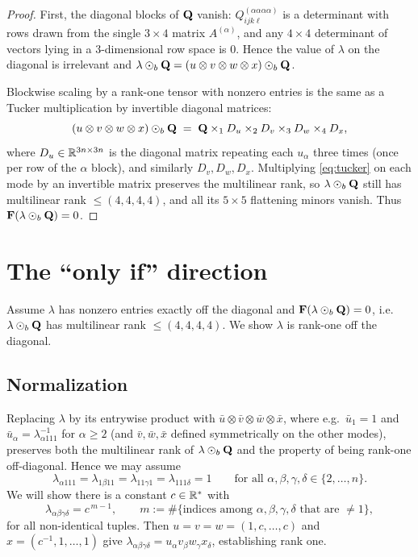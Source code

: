\documentclass[11pt]{article}
\begin{document}
\begin{proof}
First, the diagonal blocks of $\mathbf{Q}$ vanish: $Q^{(\alpha\alpha\alpha\alpha)}_{ijk\ell}$
is a determinant with rows drawn from the single $3\times4$ matrix $A^{(\alpha)}$,
and any $4\times4$ determinant of vectors lying in a $3$-dimensional row space is
$0$. Hence the value of $\lambda$ on the diagonal is irrelevant and
$\lambda\odot_b\mathbf{Q}=(u\otimes v\otimes w\otimes x)\odot_b\mathbf{Q}$.

Blockwise scaling by a rank-one tensor with nonzero entries is the same as a
Tucker multiplication by invertible diagonal matrices:
\[
  (u\otimes v\otimes w\otimes x)\odot_b\mathbf{Q}
   \;=\;\mathbf{Q}\times_1 D_u\times_2 D_v\times_3 D_w\times_4 D_x,
\]
where $D_u\in\mathbb{R}^{3n\times3n}$ is the diagonal matrix repeating each $u_\alpha$
three times (once per row of the $\alpha$ block), and similarly $D_v,D_w,D_x$.
Multiplying \eqref{eq:tucker} on each mode by an invertible matrix preserves the
multilinear rank, so $\lambda\odot_b\mathbf{Q}$ still has multilinear rank
$\le(4,4,4,4)$, and all its $5\times5$ flattening minors vanish. Thus
$\mathbf{F}(\lambda\odot_b\mathbf{Q})=0$.
\end{proof}

\section*{The ``only if'' direction}

Assume $\lambda$ has nonzero entries exactly off the diagonal and
$\mathbf{F}(\lambda\odot_b\mathbf{Q})=0$, i.e.\ $\lambda\odot_b\mathbf{Q}$ has multilinear rank
$\le(4,4,4,4)$. We show $\lambda$ is rank-one off the diagonal.

\subsection*{Normalization}

Replacing $\lambda$ by its entrywise product with $\bar u\otimes\bar v\otimes\bar w\otimes\bar x$,
where e.g.\ $\bar u_1=1$ and $\bar u_\alpha=\lambda_{\alpha111}^{-1}$ for
$\alpha\ge2$ (and $\bar v,\bar w,\bar x$ defined symmetrically on the other
modes), preserves both the multilinear rank of $\lambda\odot_b\mathbf{Q}$ and the
property of being rank-one off-diagonal. Hence we may assume
\begin{equation}\label{eq:normalize}
  \lambda_{\alpha111}=\lambda_{1\beta11}=\lambda_{11\gamma1}=\lambda_{111\delta}=1
  \qquad\text{for all }\alpha,\beta,\gamma,\delta\in\{2,\dots,n\}.
\end{equation}
We will show there is a constant $c\in\mathbb{R}^{*}$ with
\begin{equation}\label{eq:goal}
  \lambda_{\alpha\beta\gamma\delta}=c^{\,m-1},
  \qquad m:=\#\{\text{indices among }\alpha,\beta,\gamma,\delta\text{ that are }\ne 1\},
\end{equation}
for all non-identical tuples. Then $u=v=w=(1,c,\dots,c)$ and
$x=(c^{-1},1,\dots,1)$ give $\lambda_{\alpha\beta\gamma\delta}=u_\alpha v_\beta w_\gamma x_\delta$,
establishing rank one.
\end{document}
